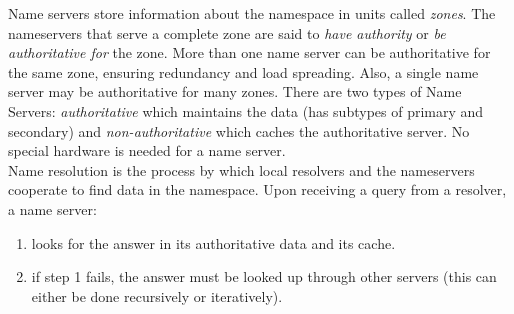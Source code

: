 Name servers store information about the namespace in units called \textit{zones}. The nameservers that serve a complete zone are said to \textit{have authority} or \textit{be authoritative for} the zone. More than one name server can be authoritative for the same zone, ensuring redundancy and load spreading. Also, a single name server may be authoritative for many zones. There are two types of Name Servers: \textit{authoritative} which maintains the data (has subtypes of primary and secondary) and \textit{non-authoritative} which caches the authoritative server. No special hardware is needed for a name server.\\

Name resolution is the process by which local resolvers and the nameservers cooperate to find data in the namespace. Upon receiving a query from a resolver, a name server:
\begin{enumerate}
    \item looks for the answer in its authoritative data and its cache.
    \item if step 1 fails, the answer must be looked up through other servers (this can either be done recursively or iteratively).
\end{enumerate}